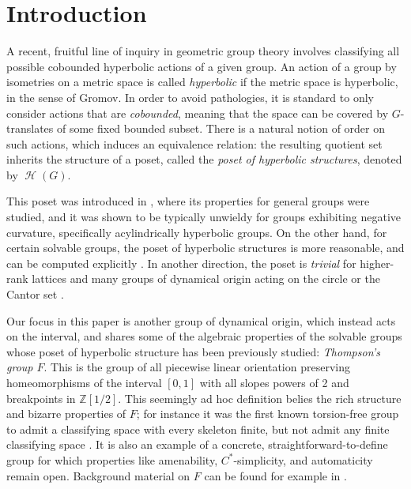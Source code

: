 \documentclass[reqno,12pt]{amsart}\setcounter{tocdepth}{1}
\theoremstyle{definition}
\newcommand{\Z}{\mathbb{Z}}
\DeclareMathOperator{\Hyp}{\mathcal{H}}
\numberwithin{equation}{section}
\begin{document}
\maketitle
\thispagestyle{empty}

\tableofcontents

\section*{Introduction}

A recent, fruitful line of inquiry in geometric group theory involves classifying all possible cobounded hyperbolic actions of a given group. An action of a group by isometries on a metric space is called \emph{hyperbolic} if the metric space is hyperbolic, in the sense of Gromov. In order to avoid pathologies, it is standard to only consider actions that are \emph{cobounded}, meaning that the space can be covered by $G$-translates of some fixed bounded subset. There is a natural notion of order on such actions, which induces an equivalence relation: the resulting quotient set inherits the structure of a poset, called the \emph{poset of hyperbolic structures}, denoted by $\Hyp(G)$.

This poset was introduced in \cite{ABO}, where its properties for general groups were studied, and it was shown to be typically unwieldy for groups exhibiting negative curvature, specifically acylindrically hyperbolic groups. On the other hand, for certain solvable groups, the poset of hyperbolic structures is more reasonable, and can be computed explicitly \cite{caprace15, sahana:wreath, AR:BS, confining, ABR2}. In another direction, the poset is \emph{trivial} for higher-rank lattices \cite{haettel} and many groups of dynamical origin acting on the circle or the Cantor set \cite{anthony, NL}.

\medskip

Our focus in this paper is another group of dynamical origin, which instead acts on the interval, and shares some of the algebraic properties of the solvable groups whose poset of hyperbolic structure has been previously studied: \emph{Thompson's group $F$}.
This is the group of all piecewise linear orientation preserving homeomorphisms of the interval $[0,1]$ with all slopes powers of 2 and breakpoints in $\Z[1/2]$. This seemingly ad hoc definition belies the rich structure and bizarre properties of $F$; for instance it was the first known torsion-free group to admit a classifying space with every skeleton finite, but not admit any finite classifying space \cite{brown84}. It is also an example of a concrete, straightforward-to-define group for which properties like amenability, $C^*$-simplicity, and automaticity remain open. Background material on $F$ can be found for example in \cite{belk04,cannon96}.
\end{document}
